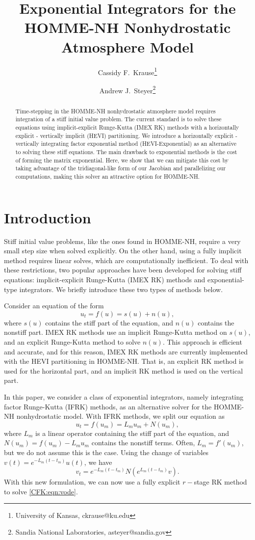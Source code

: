 \documentclass{csri19}
\title{Exponential Integrators for the HOMME-NH Nonhydrostatic Atmosphere
 Model}
\author{Cassidy F.\ Krause\thanks{University of Kansas, ckrause@ku.edu}
\and Andrew J.\ Steyer\thanks{Sandia National Laboratories, asteyer@sandia.gov}}
\begin{document}
\maketitle

\begin{abstract}
Time-stepping in the HOMME-NH nonhydrostatic atmosphere model requires 
integration of a stiff initial value problem. The current standard is to
 solve these equations using implicit-explicit Runge-Kutta (IMEX RK) 
methods with a horizontally explicit - vertically implicit (HEVI) 
partitioning. We introduce a horizontally explicit - vertically integrating
 factor exponential method (HEVI-Exponential) as an alternative to solving 
these stiff equations. The main drawback to exponential methods is the cost
 of forming the matrix exponential. Here, we show that we can mitigate this 
cost by taking advantage of the tridiagonal-like form of our Jacobian and 
parallelizing our computations, making this solver an attractive option for
HOMME-NH.
\end{abstract}

\section{Introduction} \label{CFK:sec:intro}
Stiff initial value problems, like the ones found in HOMME-NH, require a 
very small step size when solved explicitly. On the other hand, using a 
fully implicit method requires linear solves, which are computationally 
inefficient. To deal with these restrictions, two popular approaches have 
been developed for solving stiff equations: implicit-explicit Runge-Kutta 
(IMEX RK) methods and exponential-type integrators. We briefly introduce 
these two types of methods below.

Consider an equation of the form \[ u_t = f(u) = s(u) + n(u),\] where $s(u)$ 
contains the stiff part of the equation, and $n(u)$ contains the nonstiff 
part. IMEX RK methods use an implicit Runge-Kutta method on $s(u)$, and an 
explicit Runge-Kutta method to solve $n(u)$. This approach is efficient and 
accurate, and for this reason, IMEX RK methods are currently implemented 
with the HEVI partitioning in HOMME-NH. That is, an explicit RK method is 
used for the horizontal part, and an implicit RK method is used on the 
vertical part.

In this paper, we consider a class of exponential integrators, namely 
integrating factor Runge-Kutta (IFRK) methods, as an alternative solver for 
the HOMME-NH nonhydrostatic model. With IFRK methods, we split our equation 
as \[ u_t = f(u_m) = L_mu_m + N(u_m),\] where $L_m$ is a linear operator 
containing the stiff part of the equation, and $N(u_m) = f(u_m)-L_mu_m$ 
contains the nonstiff terms. Often, $L_m = f'(u_m)$, but we do not assume 
this is the case. Using the change of variables $v(t) = 
e^{-L_m(t-t_m)}u(t)$, we have
\begin{equation}\label{CFK:eqn:vode}
v_t = e^{-L_m(t-t_m)}N(e^{L_m(t-t_m)}v).
\end{equation} 
With this new formulation, we can now use a fully explicit $r-$stage RK 
method to solve 
\ref{CFK:eqn:vode}.
\end{document}
